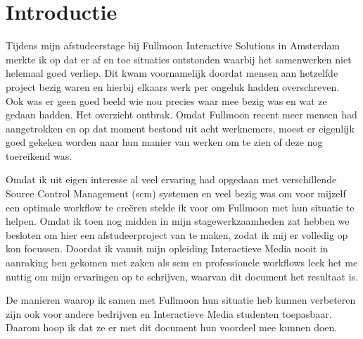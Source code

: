 
\setcounter{chapter}{0}
\chapter{Introductie}
  
Tijdens mijn afstudeerstage bij Fullmoon Interactive Solutions in Amsterdam merkte ik op dat er af en toe situaties ontstonden waarbij het samenwerken niet helemaal goed verliep. Dit kwam voornamelijk doordat mensen aan hetzelfde project bezig waren en hierbij elkaars werk per ongeluk hadden overschreven. Ook was er geen goed beeld wie nou precies waar mee bezig was en wat ze gedaan hadden. Het overzicht ontbrak. Omdat Fullmoon recent meer mensen had aangetrokken en op dat moment bestond uit acht werknemers, moest er eigenlijk goed gekeken worden naar hun manier van werken om te zien of deze nog toereikend was.

Omdat ik uit eigen interesse al veel ervaring had opgedaan met verschillende Source Control Management ({\sc scm}) systemen en veel bezig was om voor mijzelf een optimale workflow te creëren stelde ik voor om Fullmoon met hun situatie te helpen. Omdat ik toen nog midden in mijn stagewerkzaamheden zat hebben we besloten om hier een afstudeerproject van te maken, zodat ik mij er volledig op kon focussen. Doordat ik vanuit mijn opleiding Interactieve Media nooit in aanraking ben gekomen met zaken als {\sc scm} en professionele workflows leek het me nuttig om mijn ervaringen op te schrijven, waarvan dit document het resultaat is.

De manieren waarop ik samen met Fullmoon hun situatie heb kunnen verbeteren zijn ook voor andere bedrijven en Interactieve Media studenten toepasbaar. Daarom hoop ik dat ze er met dit document hun voordeel mee kunnen doen.
